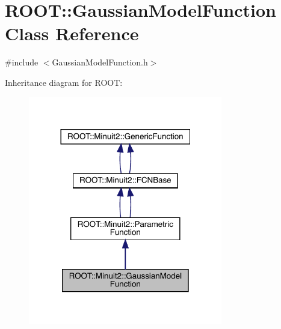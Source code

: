\hypertarget{classROOT_1_1Minuit2_1_1GaussianModelFunction}{}\section{R\+O\+OT\+:\+:Gaussian\+Model\+Function Class Reference}
\label{classROOT_1_1Minuit2_1_1GaussianModelFunction}


{\ttfamily \#include $<$Gaussian\+Model\+Function.\+h$>$}



Inheritance diagram for R\+O\+OT\+:\nopagebreak
\begin{figure}[H]
\begin{center}
\leavevmode
\includegraphics[width=240pt]{d1/da2/classROOT_1_1Minuit2_1_1GaussianModelFunction__inherit__graph}
\end{center}
\end{figure}


